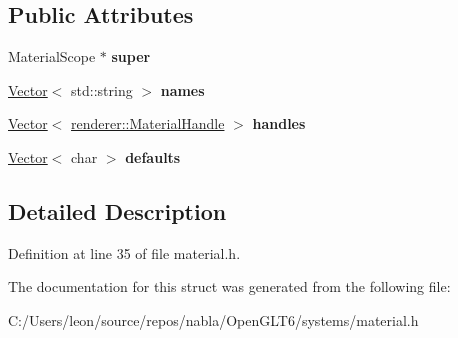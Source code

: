 \subsection*{Public Attributes}
\begin{DoxyCompactItemize}
\item 
\mbox{\label{structnabla_1_1_matrial_systerm_1_1_material_prototype_a40029acfaa8159937ff37fde877bd0ed}} 
Material\+Scope $\ast$ {\bfseries super}
\item 
\mbox{\label{structnabla_1_1_matrial_systerm_1_1_material_prototype_ad7ef8ec83dc0b046c513f80934987acd}} 
\mbox{\hyperlink{classnabla_1_1_s_t_l_vector_ex}{Vector}}$<$ std\+::string $>$ {\bfseries names}
\item 
\mbox{\label{structnabla_1_1_matrial_systerm_1_1_material_prototype_ac177ff0a958cf20c1123e9485b0bf8c0}} 
\mbox{\hyperlink{classnabla_1_1_s_t_l_vector_ex}{Vector}}$<$ \mbox{\hyperlink{classnabla_1_1renderer_1_1_handle}{renderer\+::\+Material\+Handle}} $>$ {\bfseries handles}
\item 
\mbox{\label{structnabla_1_1_matrial_systerm_1_1_material_prototype_ad120944e687247411a720ba04c0ed9cc}} 
\mbox{\hyperlink{classnabla_1_1_s_t_l_vector_ex}{Vector}}$<$ char $>$ {\bfseries defaults}
\end{DoxyCompactItemize}


\subsection{Detailed Description}


Definition at line 35 of file material.\+h.



The documentation for this struct was generated from the following file\+:\begin{DoxyCompactItemize}
\item 
C\+:/\+Users/leon/source/repos/nabla/\+Open\+G\+L\+T6/systems/material.\+h\end{DoxyCompactItemize}
